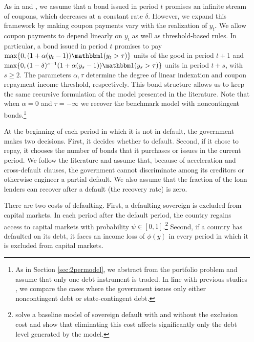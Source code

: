 As in \cite{JIE} and \cite{ArellanoRamanarayanan}, we assume that a bond issued in period $t$ promises an infinite stream of coupons, which decreases at a constant rate $\delta$. However, we expand this framework by making coupon payments vary with the realization of $y_t$. We allow coupon payments to depend linearly on $y_t$ as well as threshold-based rules. In particular, a bond issued in period $t$ promises to pay $\max \{0, (1+\alpha(y_t-1)) \ind (y_t > \tau) \}$ units of the good in period $t+1$ and $\max \{0, (1-\delta)^{s-1} (1+\alpha(y_s-1)) \ind (y_s > \tau) \}$ units in period $t+s$, with $s \geq 2$. The parameters ${\alpha, \tau}$ determine the degree of linear indexation and coupon repayment income threshold, respectively. This bond structure allows us to keep the same recursive formulation of the model presented in the literature. Note that when $\alpha=0$ and $\tau=-\infty$ we recover the benchmark model with noncontingent bonds.\footnote{As in Section \ref{sec:2permodel}, we abstract from the portfolio problem and assume that only one debt instrument is traded. In line with previous studies \citep{BorenszteinMauro2004, Durdu, HMindexed2012, HMSP16, SandlerisSaprizaTaddei2017, KimOstry2021, SosaPadillaStruzenegger2021}, we compare the cases where the government issues only either noncontingent debt or state-contingent debt.}

At the beginning of each period in which it is not in default, the government makes two decisions. First, it decides whether to default. Second, if it chose to repay, it chooses the number of bonds that it purchases or issues in the current period. We follow the literature and assume that, because of acceleration and cross-default clauses, the government cannot discriminate among its creditors or otherwise engineer a partial default. We also assume that the fraction of the loan lenders can recover after a default (the recovery rate) is zero.

There are two costs of defaulting. First, a defaulting sovereign is excluded from capital markets. In each period after the default
period, the country regains access to capital markets with probability $\psi \in \left[ 0,1\right] $.\footnote{\cite*{EQ_august} solve a baseline
model of sovereign default with and without the exclusion cost and show that eliminating this cost affects significantly only the debt level generated by the model.}  Second, if a country has defaulted on its debt, it faces an income loss of $\phi \left(y\right)$ in every period in which it is excluded from capital markets.  

